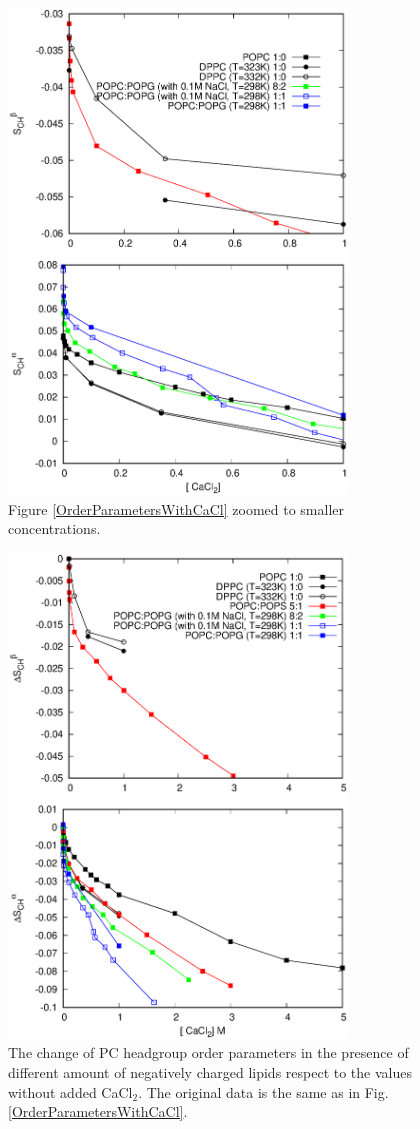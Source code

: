 \documentclass[aps,prl,superscriptaddress,twocolumn]{revtex4}
\begin{document}
\begin{figure}[]
  \centering
  \includegraphics[width=9.0cm]{../Figs/LIPIDSwithCaClBELOW1M.eps}
  \caption{\label{OrderParametersWithCaClBELOW1M}
    Figure \ref{OrderParametersWithCaCl} zoomed to smaller concentrations.
  }
\end{figure}
\begin{figure}[]
  \centering
  \includegraphics[width=9.0cm]{../Figs/CHANGESwithCaCl.eps}
  \caption{\label{OrderParameterCHANGESWithCaClBELOW1M}
    The change of PC headgroup order parameters
    in the presence of different amount of negatively charged lipids
    respect to the values without added CaCl$_2$.
    The original data is the same as in Fig. \ref{OrderParametersWithCaCl}. 
  }
\end{figure}
\end{document}
